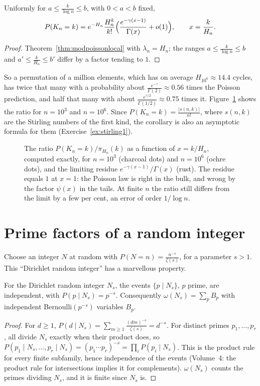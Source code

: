\begin{corollary}\label{cor:cyclesdev}
Uniformly for $a\le\frac k{\log n}\le b$, with $0<a<b$ fixed,
\[
P(K_n=k)=e^{-H_n}\frac{H_n^k}{k!}\Bigl(\frac{e^{-\gamma(x-1)}}{\Gamma(x)}+o(1)\Bigr),\qquad x=\frac k{H_n}.
\]
\end{corollary}
\begin{proof}
Theorem~\ref{thm:modpoissonlocal} with $\lambda_n=H_n$; the ranges $a\le\frac k{\log n}\le b$ and $a'\le\frac k{H_n}\le b'$ differ by a factor tending to $1$.
\end{proof}

So a permutation of a million elements, which has on average $H_{10^6}\approx14.4$ cycles, has twice that many with a probability about $\frac{e^{-\gamma}}{\Gamma(2)}\approx0.56$ times the Poisson prediction, and half that many with
about $\frac{e^{\gamma/2}}{\Gamma(1/2)}\approx0.75$ times it. Figure~\ref{fig:cyclesratio} shows the ratio for $n=10^3$ and $n=10^6$. Since $P(K_n=k)=\frac{|s(n,k)|}{n!}$, where $s(n,k)$ are the Stirling numbers of the first kind, the corollary is
also an asymptotic formula for them (Exercise~\ref{ex:stirling1}).

\begin{figure}[ht]
\centering{}
\caption{The ratio $P(K_n=k)/\pi_{H_n}(k)$ as a function of $x=k/H_n$, computed exactly, for $n=10^3$ (charcoal dots) and $n=10^6$ (ochre dots), and the limiting residue $e^{-\gamma(x-1)}/\Gamma(x)$ (rust). The residue equals $1$ at $x=1$: the
Poisson law is right in the bulk, and wrong by the factor $\psi(x)$ in the tails. At finite $n$ the ratio still differs from the limit by a few per cent, an error of order $1/\log n$.}
\label{fig:cyclesratio}
\end{figure}

\section{Prime factors of a random integer}

Choose an integer $N$ at random with $P(N=n)=\frac{n^{-s}}{\zeta(s)}$, for a parameter $s>1$. This ``Dirichlet random integer'' has a marvellous property.

\begin{proposition}\label{prop:dirichletint}
For the Dirichlet random integer $N_s$, the events $\{p\mid N_s\}$, $p$ prime, are independent, with $P(p\mid N_s)=p^{-s}$. Consequently $\omega(N_s)=\sum_pB_p$ with independent Bernoulli$(p^{-s})$ variables $B_p$.
\end{proposition}
\begin{proof}
For $d\ge1$, $P(d\mid N_s)=\sum_{m\ge1}\frac{(dm)^{-s}}{\zeta(s)}=d^{-s}$. For distinct primes $p_1,\dots,p_r$, all divide $N_s$ exactly when their product does, so $P(p_1\mid N_s,\dots,p_r\mid N_s)=(p_1\cdots p_r)^{-s}=\prod_iP(p_i\mid N_s)$. This is
the product rule for every finite subfamily, hence independence of the events (Volume~4: the product rule for intersections implies it for complements). $\omega(N_s)$ counts the primes dividing $N_s$, and it is finite since $N_s$ is.
\end{proof}

